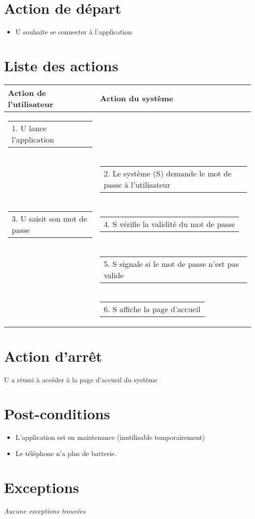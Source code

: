\documentclass[a4paper, 12pt, french]{article}
\makeatletter
\newcommand{\retourLigne}[2][c]{\begin{tabular}[#1]{@{}l@{}}#2\end{tabular}}
\makeatother
\begin{document}
\section{Action de départ}
\begin{itemize}
	\item U souhaite se connecter à l'application
\end{itemize}

\section{Liste des actions}
	\begin{longtable}{|l|l|}
 	\hline
 	\textbf{Action de l'utilisateur} & \textbf{Action du système} \\ \hline
 	\hline
	\retourLigne{1. U lance l'application} &   \\ \hline
	& \retourLigne{2. Le système (S) demande le mot de passe à l'utilisateur} \\ \hline
	\retourLigne{3. U saisit son mot de passe } & \retourLigne{4. S vérifie la validité du mot de passe} \\ \hline
	& \retourLigne{5. S signale si le mot de passe n'est pas valide}  \\ \hline
	& \retourLigne{6. S affiche la page d'accueil} \\
	\hline
	\end{longtable}

\section{Action d'arrêt}

U a réussi à accéder à la page d'accueil du système

\section{Post-conditions}

\begin{itemize}
	\item L'application est en maintenance (inutilisable temporairement) 
	\item Le téléphone n'a plus de batterie.
\end{itemize}

\section{Exceptions}
\textit{Aucune exceptions trouvées}
\end{document}
